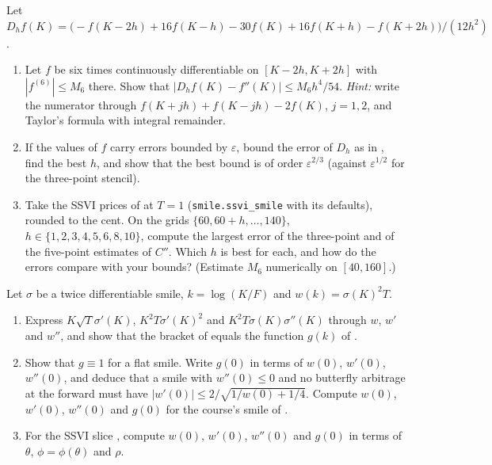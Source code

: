 \begin{exercise}\label{ex:sk-five-point}
\medium Let $D_h f(K)=\big(-f(K-2h)+16f(K-h)-30f(K)+16f(K+h)-f(K+2h)\big)/(12h^2)$.
\begin{enumerate}[label=(\alph*)]
  \item Let $f$ be six times continuously differentiable on $[K-2h,K+2h]$ with $|f^{(6)}|\le M_6$ there.
    Show that $|D_hf(K)-f''(K)|\le M_6h^4/54$. \emph{Hint:} write the numerator through
    $f(K+jh)+f(K-jh)-2f(K)$, $j=1,2$, and Taylor's formula with integral remainder.
  \item If the values of $f$ carry errors bounded by $\varepsilon$, bound the error of $D_h$ as in
    , find the best $h$, and show that the best bound is of order
    $\varepsilon^{2/3}$ (against $\varepsilon^{1/2}$ for the three-point stencil).
  \item Take the SSVI prices of  at $T=1$ (\texttt{smile.ssvi\_smile} with its
    defaults), rounded to the cent. On the grids $\{60,60+h,\dots,140\}$, $h\in\{1,2,3,4,5,6,8,10\}$,
    compute the largest error of the three-point and of the five-point estimates of $C''$. Which $h$
    is best for each, and how do the errors compare with your bounds? (Estimate $M_6$ numerically on
    $[40,160]$.)
\end{enumerate}
\end{exercise}

\begin{exercise}\label{ex:sk-durrleman}
\medium Let $\sigma$ be a twice differentiable smile, $k=\log(K/F)$ and $w(k)=\sigma(K)^2T$.
\begin{enumerate}[label=(\alph*)]
  \item Express $K\sqrt T\sigma'(K)$, $K^2T\sigma'(K)^2$ and $K^2T\sigma(K)\sigma''(K)$ through $w$, $w'$ and $w''$,
    and show that the bracket of  equals the function $g(k)$ of
    .
  \item Show that $g\equiv1$ for a flat smile. Write $g(0)$ in terms of $w(0)$, $w'(0)$, $w''(0)$, and
    deduce that a smile with $w''(0)\le0$ and no butterfly arbitrage at the forward must have
    $|w'(0)|\le2/\sqrt{1/w(0)+1/4}$. Compute $w(0)$, $w'(0)$, $w''(0)$ and $g(0)$ for the course's smile of
    .
  \item For the SSVI slice , compute $w(0)$, $w'(0)$, $w''(0)$ and $g(0)$ in terms of
    $\theta$, $\phi=\phi(\theta)$ and $\rho$.
\end{enumerate}
\end{exercise}

